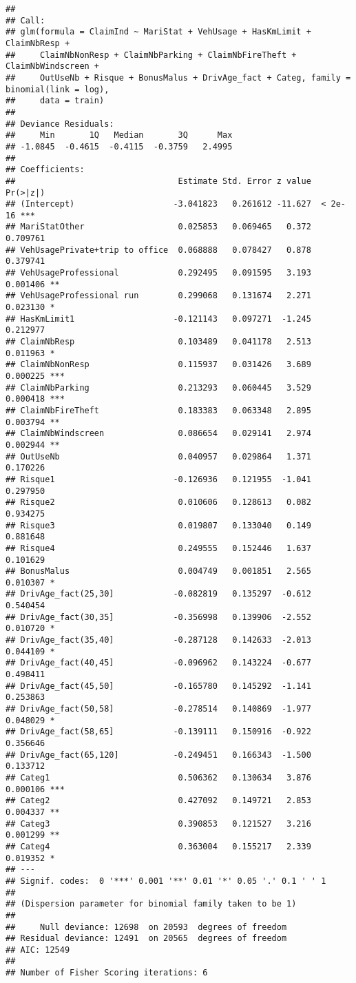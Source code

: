 \documentclass[
]{article}
\begin{document}
\begin{verbatim}
## 
## Call:
## glm(formula = ClaimInd ~ MariStat + VehUsage + HasKmLimit + ClaimNbResp + 
##     ClaimNbNonResp + ClaimNbParking + ClaimNbFireTheft + ClaimNbWindscreen + 
##     OutUseNb + Risque + BonusMalus + DrivAge_fact + Categ, family = binomial(link = log), 
##     data = train)
## 
## Deviance Residuals: 
##     Min       1Q   Median       3Q      Max  
## -1.0845  -0.4615  -0.4115  -0.3759   2.4995  
## 
## Coefficients:
##                                 Estimate Std. Error z value Pr(>|z|)    
## (Intercept)                    -3.041823   0.261612 -11.627  < 2e-16 ***
## MariStatOther                   0.025853   0.069465   0.372 0.709761    
## VehUsagePrivate+trip to office  0.068888   0.078427   0.878 0.379741    
## VehUsageProfessional            0.292495   0.091595   3.193 0.001406 ** 
## VehUsageProfessional run        0.299068   0.131674   2.271 0.023130 *  
## HasKmLimit1                    -0.121143   0.097271  -1.245 0.212977    
## ClaimNbResp                     0.103489   0.041178   2.513 0.011963 *  
## ClaimNbNonResp                  0.115937   0.031426   3.689 0.000225 ***
## ClaimNbParking                  0.213293   0.060445   3.529 0.000418 ***
## ClaimNbFireTheft                0.183383   0.063348   2.895 0.003794 ** 
## ClaimNbWindscreen               0.086654   0.029141   2.974 0.002944 ** 
## OutUseNb                        0.040957   0.029864   1.371 0.170226    
## Risque1                        -0.126936   0.121955  -1.041 0.297950    
## Risque2                         0.010606   0.128613   0.082 0.934275    
## Risque3                         0.019807   0.133040   0.149 0.881648    
## Risque4                         0.249555   0.152446   1.637 0.101629    
## BonusMalus                      0.004749   0.001851   2.565 0.010307 *  
## DrivAge_fact(25,30]            -0.082819   0.135297  -0.612 0.540454    
## DrivAge_fact(30,35]            -0.356998   0.139906  -2.552 0.010720 *  
## DrivAge_fact(35,40]            -0.287128   0.142633  -2.013 0.044109 *  
## DrivAge_fact(40,45]            -0.096962   0.143224  -0.677 0.498411    
## DrivAge_fact(45,50]            -0.165780   0.145292  -1.141 0.253863    
## DrivAge_fact(50,58]            -0.278514   0.140869  -1.977 0.048029 *  
## DrivAge_fact(58,65]            -0.139111   0.150916  -0.922 0.356646    
## DrivAge_fact(65,120]           -0.249451   0.166343  -1.500 0.133712    
## Categ1                          0.506362   0.130634   3.876 0.000106 ***
## Categ2                          0.427092   0.149721   2.853 0.004337 ** 
## Categ3                          0.390853   0.121527   3.216 0.001299 ** 
## Categ4                          0.363004   0.155217   2.339 0.019352 *  
## ---
## Signif. codes:  0 '***' 0.001 '**' 0.01 '*' 0.05 '.' 0.1 ' ' 1
## 
## (Dispersion parameter for binomial family taken to be 1)
## 
##     Null deviance: 12698  on 20593  degrees of freedom
## Residual deviance: 12491  on 20565  degrees of freedom
## AIC: 12549
## 
## Number of Fisher Scoring iterations: 6
\end{verbatim}
\end{document}
